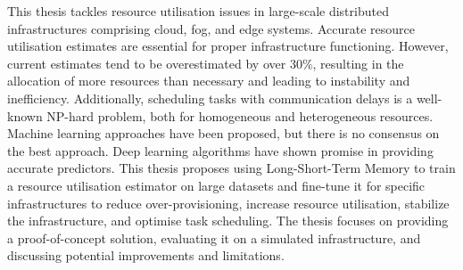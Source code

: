 This thesis tackles resource utilisation issues in large-scale distributed infrastructures comprising cloud, fog, and edge systems. Accurate resource utilisation estimates are essential for proper infrastructure functioning. However, current estimates tend to be overestimated by over 30\%, resulting in the allocation of more resources than necessary and leading to instability and inefficiency. Additionally, scheduling tasks with communication delays is a well-known NP-hard problem, both for homogeneous and heterogeneous resources. Machine learning approaches have been proposed, but there is no consensus on the best approach. Deep learning algorithms have shown promise in providing accurate predictors. This thesis proposes using Long-Short-Term Memory to train a resource utilisation estimator on large datasets and fine-tune it for specific infrastructures to reduce over-provisioning, increase resource utilisation, stabilize the infrastructure, and optimise task scheduling. The thesis focuses on providing a proof-of-concept solution, evaluating it on a simulated infrastructure, and discussing potential improvements and limitations. 
  \vfill